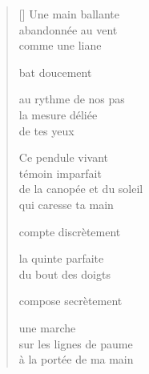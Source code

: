 \documentclass[11pt,a4paper]{article}
\begin{document}
\thispagestyle{empty}


\settowidth{\versewidth}{de la canopée et du soleil}

\bigskip

\begin{verse}[\versewidth]
  Une main ballante \\
  abandonnée au vent \\
  comme une liane

  bat doucement

  au rythme de nos pas \\
  la mesure déliée \\
  de tes yeux

  Ce pendule vivant \\
  témoin imparfait \\
  de la canopée et du soleil \\
  qui caresse ta main

  compte discrètement

  la quinte parfaite \\
  du bout des doigts

  compose secrètement

  une marche \\
  sur les lignes de paume \\
  à la portée de ma main
\end{verse}
\end{document}
